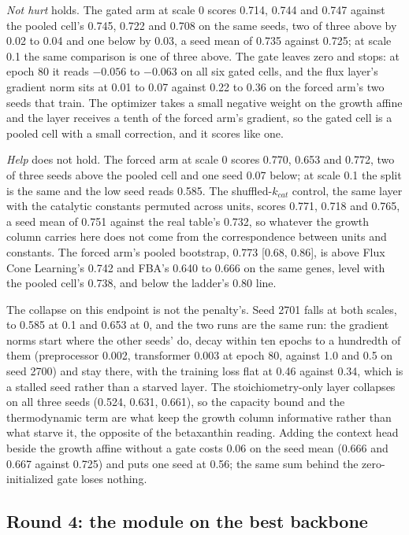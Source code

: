 \emph{Not hurt} holds. The gated arm at scale 0 scores 0.714, 0.744 and 0.747 against the
pooled cell's 0.745, 0.722 and 0.708 on the same seeds, two of three above by 0.02 to
0.04 and one below by 0.03, a seed mean of 0.735 against 0.725; at scale 0.1 the same
comparison is one of three above. The gate leaves zero and stops: at epoch 80 it reads
$-0.056$ to $-0.063$ on all six gated cells, and the flux layer's gradient norm sits at
0.01 to 0.07 against 0.22 to 0.36 on the forced arm's two seeds that train. The optimizer takes a small negative
weight on the growth affine and the layer receives a tenth of the forced arm's gradient,
so the gated cell is a pooled cell with a small correction, and it scores like one.

\emph{Help} does not hold. The forced arm at scale 0 scores 0.770, 0.653 and 0.772, two
of three seeds above the pooled cell and one seed 0.07 below; at scale 0.1 the split is the
same and the low seed reads 0.585. The shuffled-$k_{cat}$ control, the same layer with the
catalytic constants permuted across units, scores 0.771, 0.718 and 0.765, a seed mean of
0.751 against the real table's 0.732, so whatever the growth column carries here does not
come from the correspondence between units and constants. The forced arm's pooled
bootstrap, 0.773 [0.68, 0.86], is above Flux Cone Learning's 0.742 and FBA's 0.640 to
0.666 on the same genes, level with the pooled cell's 0.738, and below the ladder's
0.80 line.

The collapse on this endpoint is not the penalty's. Seed 2701 falls at both scales, to
0.585 at 0.1 and 0.653 at 0, and the two runs are the same run: the gradient norms start
where the other seeds' do, decay within ten epochs to a hundredth of them (preprocessor
0.002, transformer 0.003 at epoch 80, against 1.0 and 0.5 on seed 2700) and stay there,
with the training loss flat at 0.46 against 0.34, which is a stalled seed rather than a
starved layer. The
stoichiometry-only layer collapses on all three seeds (0.524, 0.631, 0.661), so the
capacity bound and the thermodynamic term are what keep the growth column informative
rather than what starve it, the opposite of the betaxanthin reading. Adding the context
head beside the growth affine without a gate costs 0.06 on the seed mean (0.666 and
0.667 against 0.725) and puts one seed at 0.56; the same sum behind the zero-initialized
gate loses nothing.

\subsection{Round 4: the module on the best backbone}

